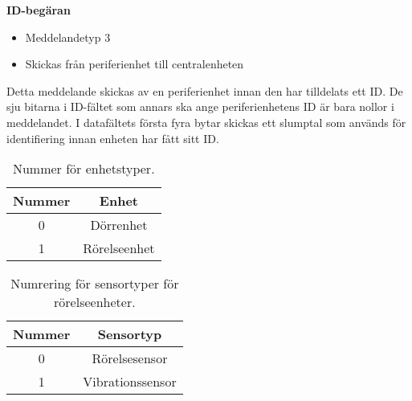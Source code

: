 \textbf{ID-begäran}
\begin{itemize}
    \item Meddelandetyp 3
    \item Skickas från periferienhet till centralenheten
\end{itemize}
Detta meddelande skickas av en periferienhet innan den har tilldelats ett ID. 
De sju bitarna i ID-fältet som annars ska ange periferienhetens ID är bara nollor i meddelandet.
 I datafältets första fyra bytar skickas ett slumptal som används för identifiering 
 innan enheten har fått sitt ID.\\
\begin{table}[htb]
	\centering
	\begin{tabular}{|c|c|}
		\hline
		Nummer & Enhet \\ \hline \hline
		0 & Dörrenhet \\ \hline
		1 & Rörelseenhet \\ \hline

	\end{tabular}
	\caption{Nummer för enhetstyper.}
	\label{tab:enhetstyper}
\end{table}

\begin{table}[htb]
	\centering
	\begin{tabular}{|c|c|}
		\hline
		Nummer & Sensortyp \\ \hline \hline
		0 & Rörelsesensor \\ \hline
		1 & Vibrationssensor \\ \hline

	\end{tabular}
	\caption{Numrering för sensortyper för rörelseenheter.}
	\label{tab:sensortyper}
\end{table}
